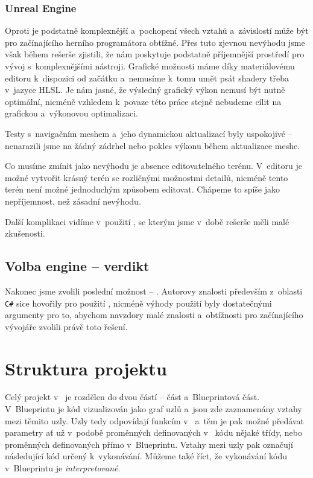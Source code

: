 \subsubsection{Unreal Engine}
Oproti \UN{} je \UE{} podstatně komplexnější a~pochopení všech vztahů a~závislostí může být pro začínajícího herního programátora obtížné. Přes tuto zjevnou nevýhodu jsme však během rešerše zjistili, že \UE{} nám poskytuje podstatně příjemnější prostředí pro vývoj s~komplexnějšími nástroji. Grafické možnosti máme díky materiálovému editoru k~dispozici od začátku a~nemusíme k~tomu umět psát shadery třeba v~jazyce HLSL. Je nám jasné, že výsledný grafický výkon nemusí být nutně optimální, nicméně vzhledem k~povaze této práce stejně nebudeme cílit na grafickou a~výkonovou optimalizaci.

Testy s~navigačním meshem a~jeho dynamickou aktualizací byly uspokojivé -- nenarazili jsme na žádný zádrhel nebo pokles výkonu během aktualizace meshe. 

Co musíme zmínit jako nevýhodu je absence editovatelného terénu. V~editoru je možné vytvořit krásný terén se rozličnými možnostmi detailů, nicméně tento terén není možné jednoduchým způsobem editovat. Chápeme to spíše jako nepříjemnost, než zásadní nevýhodu. 

Další komplikaci vidíme v~použití \CPP{}, se kterým jsme v~době rešerše měli malé zkušenosti.




\subsection{Volba engine -- verdikt}


Nakonec jsme zvolili poslední možnost -- \UE{}. Autorovy znalosti především z~oblasti \texttt{C\#} sice hovořily pro použití \UN{}, nicméně výhody použití \UE{} byly dostatečnými argumenty pro to, abychom navzdory malé znalosti \CPP{} a~obtížnosti pro začínajícího vývojáře zvolili právě toto řešení.

\section{Struktura projektu}

Celý projekt v~\UE{} je rozdělen do dvou částí -- \CPP{} část a~Blueprintová část. V~Blueprintu je kód vizualizován jako graf uzlů a~jsou zde zaznamenány vztahy mezi těmito uzly. Uzly tedy odpovídají funkcím v~\CPP{} a~těm je pak možné předávat parametry ať už v~podobě proměnných definovaných v~\CPP{} kódu nějaké třídy, nebo proměnných definovaných přímo v~Blueprintu. Vztahy mezi uzly pak označují následující kód určený k~vykonávání. Můžeme také říct, že vykonávání kódu v~Blueprintu je \textit{interpretované}.

